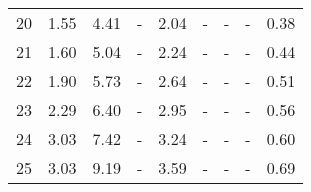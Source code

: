 \begin{table}
\begin{tabular}{lllllllll}
20 &  1.55 &  4.41 &       - &  2.04 &      - &       - &        - &     0.38 \\
21 &  1.60 &  5.04 &       - &  2.24 &      - &       - &        - &     0.44 \\
22 &  1.90 &  5.73 &       - &  2.64 &      - &       - &        - &     0.51 \\
23 &  2.29 &  6.40 &       - &  2.95 &      - &       - &        - &     0.56 \\
24 &  3.03 &  7.42 &       - &  3.24 &      - &       - &        - &     0.60 \\
25 &  3.03 &  9.19 &       - &  3.59 &      - &       - &        - &     0.69 \\
\bottomrule
\end{tabular}
\end{table}
